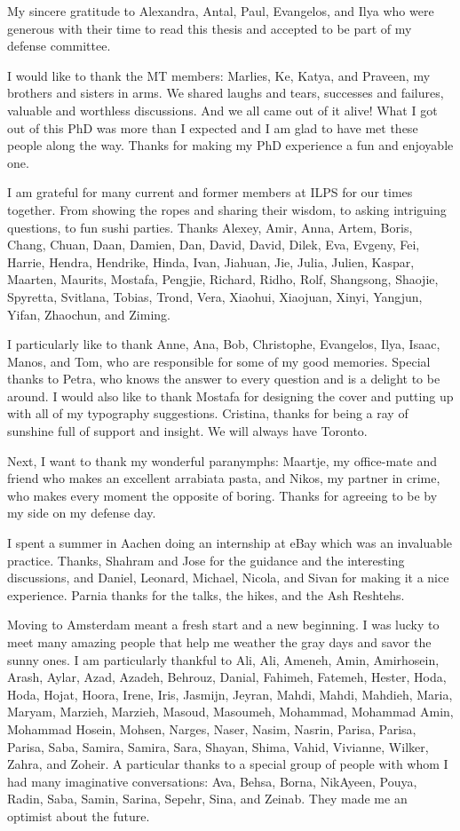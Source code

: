 {%
My sincere gratitude to Alexandra, Antal, Paul, Evangelos, and Ilya who were generous with their time to read this thesis and accepted to be part of my defense committee. 

I would like to thank the MT members: Marlies, Ke, Katya, and Praveen, my brothers and sisters in arms. 
We shared laughs and tears, successes and failures, valuable and worthless discussions. And we all came out of it alive! 
What I got out of this PhD was more than I expected and I am glad to have met these people along the way. 
Thanks for making my PhD experience a fun and enjoyable one. 

I am grateful for many current and former members at ILPS for our times together. From showing the ropes and sharing their wisdom, to asking intriguing questions, to fun sushi parties. 
Thanks Alexey, Amir, Anna, Artem, Boris, Chang, Chuan, Daan, Damien, Dan, David, David, Dilek, Eva, Evgeny, Fei, Harrie, Hendra, Hendrike, Hinda, Ivan, Jiahuan, Jie, Julia, Julien, Kaspar, Maarten, Maurits, Mostafa, Pengjie, Richard, Ridho, Rolf, Shangsong, Shaojie, Spyretta, Svitlana, Tobias, Trond, Vera, Xiaohui, Xiaojuan, Xinyi, Yangjun, Yifan, Zhaochun, and Ziming.

I particularly like to thank Anne, Ana, Bob, Christophe, Evangelos, Ilya, Isaac, Manos, and Tom, who are responsible for some of my good memories.
Special thanks to Petra, who knows the answer to every question and is a delight to be around. 
%
I would also like to thank Mostafa for designing the cover and putting up with all of my typography suggestions.
Cristina, thanks for being a ray of sunshine full of support and insight. We will always have Toronto.

Next, I want to thank my wonderful paranymphs: Maartje, my office-mate and friend who makes an excellent arrabiata pasta, and Nikos, my partner in crime, who makes every moment the opposite of boring. 
Thanks for agreeing to be by my side on my defense day.

I spent a summer in Aachen doing an internship at eBay which was an invaluable practice. Thanks, Shahram and Jose for the guidance and the interesting discussions, and Daniel, Leonard, Michael, Nicola, and Sivan for making it a nice experience. 
Parnia thanks for the talks, the hikes, and the Ash Reshtehs. 

Moving to Amsterdam meant a fresh start and a new beginning. I was lucky to meet many amazing people that help me weather the gray days and savor the sunny ones. I am particularly thankful to Ali, Ali, Ameneh, Amin, Amirhosein, Arash, Aylar, Azad, Azadeh, Behrouz, Danial, Fahimeh, Fatemeh, Hester, Hoda, Hoda, Hojat, Hoora, Irene, Iris, Jasmijn, Jeyran, Mahdi, Mahdi, Mahdieh, Maria, Maryam, Marzieh, Marzieh, Masoud, Masoumeh, Mohammad, Mohammad Amin, Mohammad Hosein, Mohsen, Narges, Naser, Nasim, Nasrin, Parisa, Parisa, Parisa, Saba, Samira, Samira, Sara, Shayan, Shima, Vahid, Vivianne, Wilker, Zahra, and Zoheir.   
A particular thanks to a special group of people with whom I had many imaginative conversations: Ava, Behsa, Borna, NikAyeen, Pouya, Radin, Saba, Samin, Sarina, Sepehr, Sina, and Zeinab. They made me an optimist about the future. 


}
